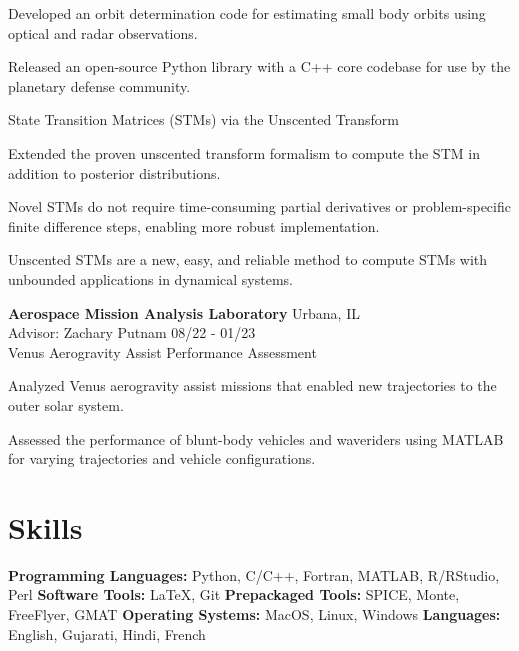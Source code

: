 \documentclass[margin,line]{res}
\newlength{\myitemspacing}
\newenvironment{list_new}{
    \begin{list}{\scriptsize{$\bullet$}}{%
        \setlength{\itemsep}{0in}
        \setlength{\parsep}{\myitemspacing} \setlength{\parskip}{0in}
        \setlength{\topsep}{0in} \setlength{\partopsep}{0in} 
        \setlength{\leftmargin}{0.2in}
        }}
    {\end{list}
}
\begin{document}
\begin{resume}
\begin{list_new}
    \item Developed an orbit determination code for estimating small body orbits using optical and radar observations.
    \item Released an open-source Python library with a C++ core codebase for use by the planetary defense community.
\end{list_new}
State Transition Matrices (STMs) via the Unscented Transform
\begin{list_new}
    \item Extended the proven unscented transform formalism to compute the STM in addition to posterior distributions.
    \item Novel STMs do not require time-consuming partial derivatives or problem-specific finite difference steps, enabling more robust implementation.
    \item Unscented STMs are a new, easy, and reliable method to compute STMs with unbounded applications in dynamical systems.
\end{list_new}
{\bf Aerospace Mission Analysis Laboratory} \hfill Urbana, IL\\
Advisor: Zachary Putnam \hfill 08/22 - 01/23\\
Venus Aerogravity Assist Performance Assessment
\begin{list_new}
    \item Analyzed Venus aerogravity assist missions that enabled new trajectories to the outer solar system.
    \item Assessed the performance of blunt-body vehicles and waveriders using MATLAB for varying trajectories and vehicle configurations.
\end{list_new}

\section{\sc Skills}
{\bf Programming Languages:} Python, C/C++, Fortran, MATLAB, R/RStudio, Perl
\vspace{\myitemspacing}\newline
{\bf Software Tools:} \LaTeX, Git
\vspace{\myitemspacing}\newline
{\bf Prepackaged Tools:} SPICE, Monte, FreeFlyer, GMAT
\vspace{\myitemspacing}\newline
{\bf Operating Systems:} MacOS, Linux, Windows
\vspace{\myitemspacing}\newline
{\bf Languages:} English, Gujarati, Hindi, French


\end{resume}
\end{document}
